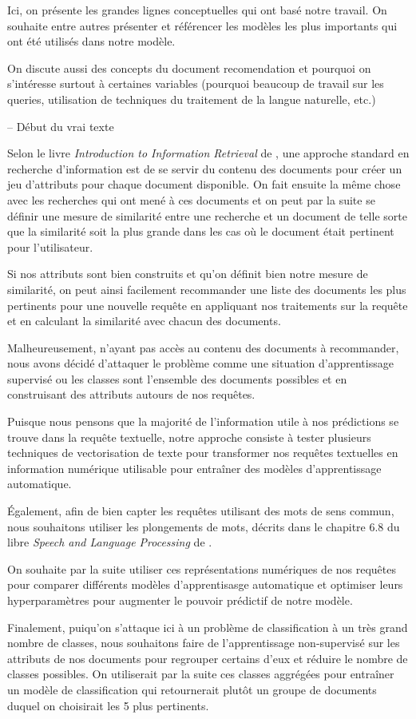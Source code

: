 Ici, on présente les grandes lignes conceptuelles qui ont basé notre travail.
On souhaite entre autres présenter et référencer les modèles les plus importants qui ont été utilisés dans notre modèle.

On discute aussi des concepts du document recomendation et pourquoi on s'intéresse surtout à certaines variables (pourquoi beaucoup de travail sur les queries, utilisation de techniques du traitement de la langue naturelle, etc.)

-- Début du vrai texte

Selon le livre \emph{Introduction to Information Retrieval} de \cite{schutze2008introduction}, une approche standard en recherche d'information est de se servir du contenu des documents pour créer un jeu d'attributs pour chaque document disponible. 
On fait ensuite la même chose avec les recherches qui ont mené à ces documents et on peut par la suite se définir une mesure de similarité entre une recherche et un document de telle sorte que la similarité soit la plus grande dans les cas où le document était pertinent pour l'utilisateur.

Si nos attributs sont bien construits et qu'on définit bien notre mesure de similarité, on peut ainsi facilement recommander une liste des documents les plus pertinents pour une nouvelle requête en appliquant nos traitements sur la requête et en calculant la similarité avec chacun des documents.


Malheureusement, n'ayant pas accès au contenu des documents à recommander, nous avons décidé d'attaquer le problème comme une situation d'apprentissage supervisé ou les classes sont l'ensemble des documents possibles et en construisant des attributs autours de nos requêtes.

Puisque nous pensons que la majorité de l'information utile à nos prédictions se trouve dans la requête textuelle, notre approche consiste à tester plusieurs techniques de vectorisation de texte pour transformer nos requêtes textuelles en information numérique utilisable pour entraîner des modèles d'apprentissage automatique.

Également, afin de bien capter les requêtes utilisant des mots de sens commun, nous souhaitons utiliser les plongements de mots, décrits dans le chapitre 6.8 du libre \emph{Speech and Language Processing} de \cite{jurafsky2014speech}.

On souhaite par la suite utiliser ces représentations numériques de nos requêtes pour comparer différents modèles d'apprentisasge automatique et optimiser leurs hyperparamètres pour augmenter le pouvoir prédictif de notre modèle.

Finalement, puiqu'on s'attaque ici à un problème de classification à un très grand nombre de classes, nous souhaitons faire de l'apprentissage non-supervisé sur les attributs de nos documents pour regrouper certains d'eux et réduire le nombre de classes possibles. On utiliserait par la suite ces classes aggrégées pour entraîner un modèle de classification qui retournerait plutôt un groupe de documents duquel on choisirait les 5 plus pertinents.

